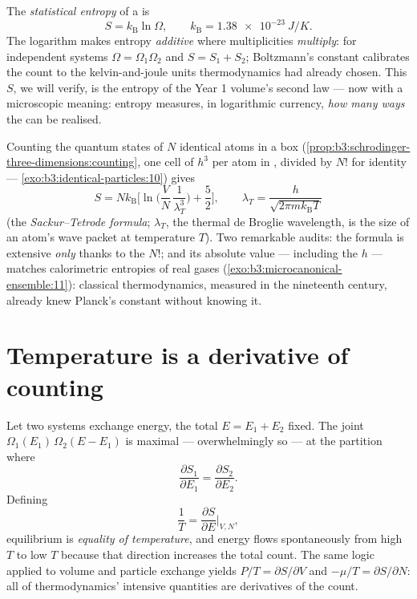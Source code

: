 \begin{definition}\label{def:b3:microcanonical-ensemble:entropy}
The \emph{statistical entropy} of a  is
\[
S = k_{\text{B}}\ln\Omega , \qquad
k_{\text{B}} = \qty{1.38e-23}{J/K} .
\]
The logarithm makes entropy \emph{additive} where multiplicities
\emph{multiply}: for independent systems $\Omega = \Omega_1\Omega_2$
and $S = S_1 + S_2$; Boltzmann's constant calibrates the count to
the kelvin-and-joule units thermodynamics had already chosen. This
$S$, we will verify, is the entropy of the Year 1 volume's second
law --- now with a microscopic meaning: entropy measures, in
logarithmic currency, \emph{how many ways} the  can be
realised.
\end{definition}

\begin{proposition}\label{prop:b3:microcanonical-ensemble:gas}
Counting the quantum states of $N$ identical atoms in a box
(\cref{prop:b3:schrodinger-three-dimensions:counting}, one cell of
$h^3$ per atom in , divided by $N!$ for identity ---
\cref{exo:b3:identical-particles:10}) gives
\[
S = Nk_{\text{B}}\Big[\ln\Big(\frac VN\,\frac1{\lambda_T^3}\Big)
 + \frac52\Big] , \qquad
\lambda_T = \frac{h}{\sqrt{2\pi mk_{\text{B}}T}}
\]
(the \emph{Sackur--Tetrode formula}; $\lambda_T$, the thermal de
Broglie wavelength, is the size of an atom's wave packet at
temperature $T$). Two remarkable audits: the formula is extensive
\emph{only} thanks to the $N!$; and its absolute value --- including
the $h$ --- matches calorimetric entropies of real gases
(\cref{exo:b3:microcanonical-ensemble:11}): classical
thermodynamics, measured in the nineteenth century, already knew
Planck's constant without knowing it.
\end{proposition}
\admitted

\section{Temperature is a derivative of counting}

\begin{theorem}\label{thm:b3:microcanonical-ensemble:temperature}
Let two systems exchange energy, the total $E = E_1 + E_2$ fixed.
The joint  $\Omega_1(E_1)\,\Omega_2(E - E_1)$ is
maximal --- overwhelmingly so --- at the partition where
\[
\frac{\partial S_1}{\partial E_1} =
\frac{\partial S_2}{\partial E_2} .
\]
Defining
\[
\frac1T = \frac{\partial S}{\partial E}\bigg|_{V,N} ,
\]
equilibrium is \emph{equality of temperature}, and energy flows
spontaneously from high $T$ to low $T$ because that direction
increases the total count. The same logic applied to volume and
particle exchange yields $P/T = \partial S/\partial V$ and $-\mu/T
= \partial S/\partial N$: all of thermodynamics' intensive
quantities are derivatives of the count.
\end{theorem}

